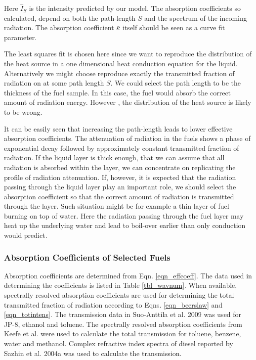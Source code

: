 Here $\hat{I}_S$ is the intensity predicted by our model.  The absorption coefficients so calculated, depend on both the path-length $S$ and the spectrum of the incoming radiation. The absorption coefficient $\bar{\kappa}$ itself should be seen as a curve fit parameter.

The least squares fit is chosen here since we want to reproduce the distribution of the heat source in a one dimensional heat conduction equation for the liquid. Alternatively we might choose reproduce exactly the transmitted fraction of radiation on at some path length $S$. We could select the path length to be the thickness of the fuel sample. In this case, the fuel would absorb the correct amount of radiation energy. However , the distribution of the heat source is likely to be wrong.

It can be easily seen that increasing the path-length leads to lower effective absorption coefficients.  The attenuation of radiation in the fuels shows a phase of exponential decay followed by approximately constant transmitted fraction of radiation. If the liquid layer is thick enough, that we can assume that all radiation is absorbed within the layer, we can concentrate on replicating the profile of radiation attenuation. If, however, it is expected that the radiation passing through the liquid layer play an important role, we should select the absorption coefficient so that the correct amount of radiation is transmitted through the layer. Such situation might be for example a thin layer of fuel burning on top of water. Here the radiation passing through the fuel layer may heat up the underlying water and lead to boil-over earlier than only conduction would predict.

\subsubsection{Absorption Coefficients of Selected Fuels}

Absorption coefficients are determined from Eqn. \ref{eqn_effcoeff}. The data used in determining the coefficients is listed in Table \ref{tbl_wavnum}. When available, spectrally resolved absorption coefficients are used for determining the total transmitted fraction of radiation according to Eqns. \ref{eqn_beerslaw} and \ref{eqn_totintens}.  The transmission data in Suo-Anttila et al. 2009 \cite{Suo-Anttila:PCT2009} was used for JP-8, ethanol and toluene. The spectrally resolved absorption coefficients from Keefe et al. were used to calculate the total transmission for toluene, benzene, water and methanol. Complex refractive index spectra of diesel reported by Sazhin et al. 2004a \cite{Sazhin:JHT2004a} was used to calculate the transmission.

